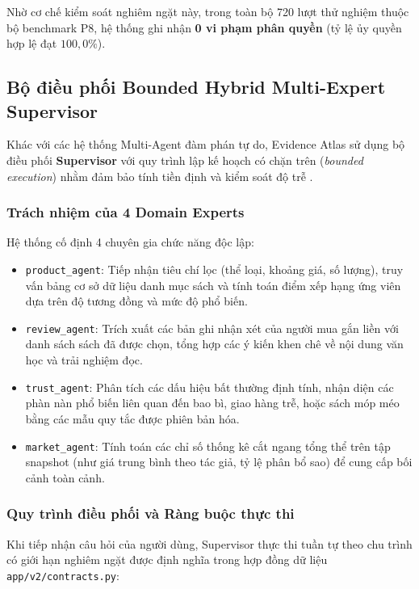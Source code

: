 Nhờ cơ chế kiểm soát nghiêm ngặt này, trong toàn bộ 720 lượt thử nghiệm thuộc bộ benchmark P8, hệ thống ghi nhận \textbf{0 vi phạm phân quyền} (tỷ lệ ủy quyền hợp lệ đạt $100{,}0\%$).

\subsection{Bộ điều phối Bounded Hybrid Multi-Expert Supervisor}
Khác với các hệ thống Multi-Agent đàm phán tự do, Evidence Atlas sử dụng bộ điều phối \textbf{Supervisor} với quy trình lập kế hoạch có chặn trên (\textit{bounded execution}) nhằm đảm bảo tính tiền định và kiểm soát độ trễ .

\subsubsection{Trách nhiệm của 4 Domain Experts}
Hệ thống cố định 4 chuyên gia chức năng độc lập:
\begin{itemize}
    \item \texttt{product\_agent}: Tiếp nhận tiêu chí lọc (thể loại, khoảng giá, số lượng), truy vấn bảng cơ sở dữ liệu danh mục sách và tính toán điểm xếp hạng ứng viên dựa trên độ tương đồng và mức độ phổ biến.
    \item \texttt{review\_agent}: Trích xuất các bản ghi nhận xét của người mua gắn liền với danh sách sách đã được chọn, tổng hợp các ý kiến khen chê về nội dung văn học và trải nghiệm đọc.
    \item \texttt{trust\_agent}: Phân tích các dấu hiệu bất thường định tính, nhận diện các phàn nàn phổ biến liên quan đến bao bì, giao hàng trễ, hoặc sách móp méo bằng các mẫu quy tắc được phiên bản hóa.
    \item \texttt{market\_agent}: Tính toán các chỉ số thống kê cắt ngang tổng thể trên tập snapshot (như giá trung bình theo tác giả, tỷ lệ phân bổ sao) để cung cấp bối cảnh toàn cảnh.
\end{itemize}

\subsubsection{Quy trình điều phối và Ràng buộc thực thi}
Khi tiếp nhận câu hỏi của người dùng, Supervisor thực thi tuần tự theo chu trình có giới hạn nghiêm ngặt được định nghĩa trong hợp đồng dữ liệu \texttt{app/v2/contracts.py}:

